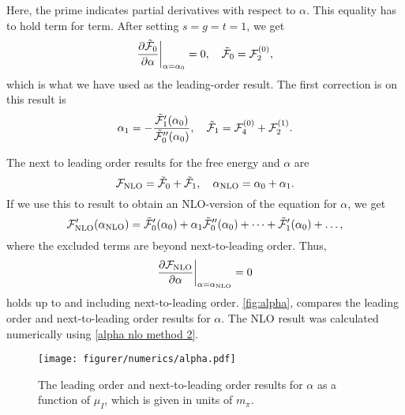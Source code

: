 Here, the prime indicates partial derivatives with respect to $\alpha$.
This equality has to hold term for term.
After setting $s = g = t = 1$, we get
\begin{align*}
    \diffp{\tilde \Ef_0}{\alpha}\bigg|_{\alpha=\alpha_0} = 0, \quad
    \tilde \Ef_0 = \Ef_2^{(0)},
\end{align*}
which is what we have used as the leading-order result. 
The first correction is on this result is
\begin{equation}
    \alpha_1 = - \frac{\tilde {\mathcal{F}}_1'(\alpha_0)}{{\tilde {\mathcal{F}}_0''(\alpha_0)}},
    \quad 
    \tilde {\mathcal{F}}_1 = \mathcal{F}_{4}^{(0)} + \mathcal{F}_{2}^{(1)}.
\end{equation}

The next to leading order results for the free energy and $\alpha$ are
\begin{equation}
    \mathcal{F}_\mathrm{NLO} = \tilde {\mathcal{F}}_0 + \tilde {\mathcal{F}}_1, \quad
    \alpha_\mathrm{NLO} = \alpha_0 + \alpha_1.
\end{equation}
If we use this to result to obtain an NLO-version of the equation for $\alpha$, we get
\begin{equation}
    \mathcal{F}_\mathrm{NLO}'(\alpha_\mathrm{NLO})
    = \tilde {\mathcal{F}}_0'(\alpha_0) + \alpha_1 \tilde {\mathcal{F}}_0''(\alpha_0) + \dots
    + \tilde {\mathcal{F}}_1'(\alpha_0) + \dots,
\end{equation}
where the excluded terms are beyond next-to-leading order.
Thus,
\begin{equation}
    \label{alpha nlo method 2}
    \diffp{\Ef_\mathrm{NLO}}{\alpha} \bigg|_{\alpha=\alpha_{\mathrm{NLO}}} = 0
\end{equation}
holds up to and including next-to-leading order. \autoref{fig:alpha}, compares the leading order and next-to-leading order results for $\alpha$.
The NLO result was calculated numerically using \cref{alpha nlo method 2}.

\begin{figure}
    \centering
    \texttt{[image: figurer/numerics/alpha.pdf]}
    \caption{The leading order and next-to-leading order results for $\alpha$ as a function of $\mu_I$, which is given in units of $m_\pi$. }
    \label{fig:alpha}
\end{figure}
